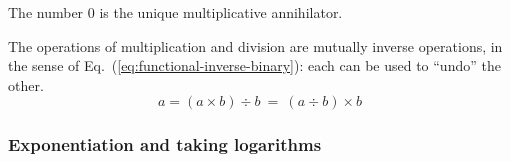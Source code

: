 \begin{prop}
The number $0$ is the unique multiplicative annihilator.
\end{prop}

\medskip


The operations of multiplication and division are mutually inverse operations, in the sense of Eq.~(\ref{eq:functional-inverse-binary}): each can be used to ``undo'' the other.
\[ a = (a \times b) \div b \ = \ (a \div b) \times b  \]

\subsubsection{Exponentiation and taking logarithms}
\label{sec:exponentiation}



